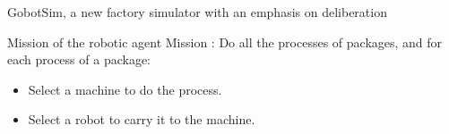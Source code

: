 \begin{frame}{GobotSim, a new factory simulator with an emphasis on deliberation}

            
\end{frame}


            

    

\begin{frame}{Mission of the robotic agent}
Mission : Do all the processes of packages, and for each process of a package:
\begin{itemize}
    \item Select a machine to do the process.
    \item Select a robot to carry it to the machine.
\end{itemize}

\end{frame}

